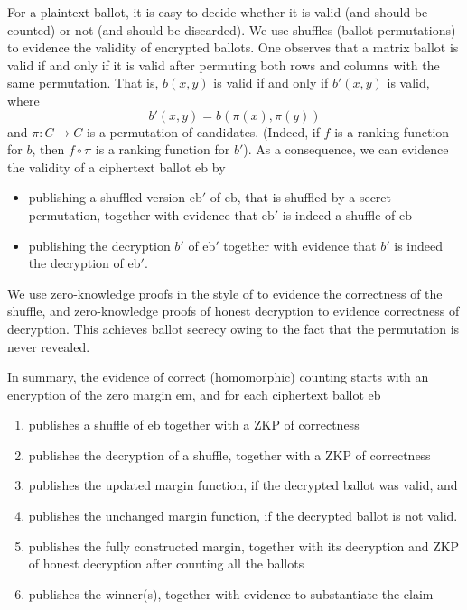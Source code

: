 \documentclass{llncs}
\newcommand{\encb}{\mathrm{eb}}
\newcommand{\encm}{\mathrm{em}}
\begin{document}
For a plaintext ballot, it is easy to decide whether it is
valid (and should be counted) or not (and should be discarded). We
use shuffles (ballot permutations) to evidence the validity of
encrypted ballots. One observes that a matrix ballot is valid if and
only if it is valid after permuting both rows and columns with the
same permutation. That is, $b(x,y)$ is valid if and only if $b'(x,y)$
is valid, where
\[ b'(x,y) = b(\pi(x), \pi(y)) \]
and $\pi: C \to C$ is a permutation of candidates. (Indeed, if $f$
is a ranking function for $b$, then $f \circ \pi$ is a ranking
function for $b'$). As a consequence, we can evidence the validity
of a ciphertext ballot $\encb$ by
\begin{itemize}
  \item publishing a shuffled version $\encb'$ of $\encb$, that is
  shuffled by a secret permutation, together with
  evidence that $\encb'$ is indeed a shuffle of $\encb$
  \item publishing the decryption $b'$ of $\encb'$ together with
  evidence that $b'$ is indeed the decryption of $\encb'$.
\end{itemize}

We use zero-knowledge proofs in the style of \cite{DBLP:conf/africacrypt/TereliusW10}
to evidence the correctness of the shuffle, and zero-knowledge
proofs of honest decryption \cite{DBLP:conf/crypto/ChaumP92} to evidence
correctness of decryption. This achieves ballot secrecy owing to the
fact that the permutation is never revealed.

In summary, the evidence of correct (homomorphic) counting starts
with an encryption of the zero margin $\encm$, and for each
ciphertext ballot $\encb$
\begin{enumerate}
\item publishes a shuffle of $\encb$ together with a ZKP of 
correctness
\item publishes the decryption of a shuffle, together with a ZKP of
correctness
\item publishes the updated margin function, if the decrypted ballot
was valid, and
\item publishes the unchanged margin function, if the decrypted
ballot is not valid.
\item publishes the fully constructed margin, together with its decryption  
  and ZKP of honest decryption after counting all the ballots     
\item publishes the winner(s), together with evidence to substantiate the
    claim
\end{enumerate}
\end{document}

